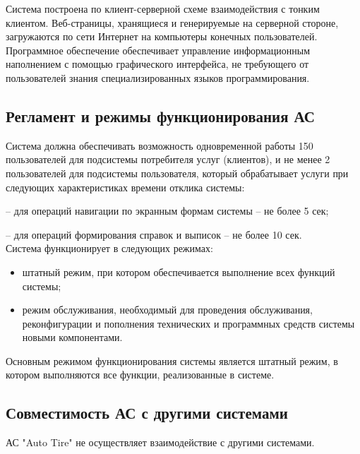 \documentclass[russian, utf8, 12pt,pointsubsection,floatsubsection]{eskdtext}
\begin{document}
Система построена по клиент-серверной схеме взаимодействия с тонким клиентом. Веб-страницы, хранящиеся и генерируемые на серверной стороне, загружаются по сети Интернет на компьютеры конечных пользователей. \\

Программное обеспечение обеспечивает управление информационным наполнением с
помощью графического интерфейса, не требующего от пользователей знания
специализированных языков программирования.\\

\subsection{Регламент и режимы функционирования АС}

Система должна обеспечивать возможность одновременной работы 150 пользователей для подсистемы потребителя услуг (клиентов), и не менее 2 пользователей для подсистемы пользователя, который обрабатывает услуги при следующих характеристиках времени отклика системы:

– для операций навигации по экранным формам системы – не более 5 сек;

– для операций формирования справок и выписок – не более 10 сек.\\


Система функционирует в следующих режимах:
\begin{itemize}
    \item штатный режим, при котором обеспечивается выполнение всех функций системы;
    \item режим обслуживания, необходимый для проведения обслуживания, реконфигурации и
пополнения технических и программных средств системы новыми компонентами.
\end{itemize}
Основным режимом функционирования системы является штатный режим, в котором
выполняются все функции, реализованные в системе.


\subsection{Совместимость АС с другими системами}
АС "Auto Tire" не осуществляет взаимодействие с другими системами.
\end{document}
